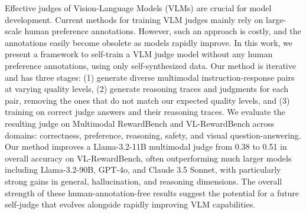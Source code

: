 
Effective judges of Vision-Language Models (VLMs) are crucial for model development. Current methods for training VLM judges mainly rely on large-scale human preference annotations. However, such an approach is costly, and the annotations easily become obsolete as models rapidly improve.
In this work, we present a framework to self-train a VLM judge model without any human preference annotations, using only self-synthesized data. 
Our method is iterative and has three stages: 
(1) generate diverse multimodal instruction-response pairs at varying quality levels, (2) generate reasoning traces and judgments for each pair, removing the ones that do not match our expected quality levels, and (3) training on correct judge answers and their reasoning traces.
We evaluate the resulting judge on Multimodal RewardBench and VL-RewardBench across domains: correctness, preference, reasoning, safety, and visual question-answering. Our method improves a Llama-3.2-11B multimodal judge from 0.38 to 0.51 in overall accuracy on VL-RewardBench, often outperforming much larger models including Llama-3.2-90B, GPT-4o, and Claude 3.5 Sonnet, with particularly strong gains in general, hallucination, and reasoning dimensions.
The overall strength of these human-annotation-free results suggest the potential for a future self-judge that evolves alongside rapidly improving VLM capabilities.